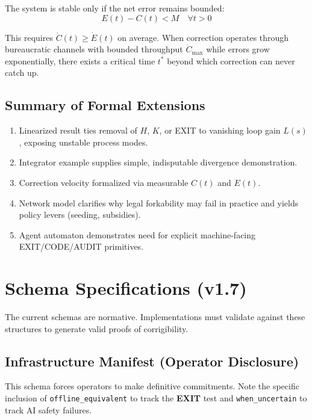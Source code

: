 \documentclass{article}
\begin{document}
The system is stable only if the net error remains bounded:
\begin{equation}
E(t) - C(t) < M \quad \forall t > 0
\end{equation}

This requires $\dot{C}(t) \geq \dot{E}(t)$ on average. When correction operates through bureaucratic channels with bounded throughput $\dot{C}_{\max}$ while errors grow exponentially, there exists a critical time $t^*$ beyond which correction can never catch up.

\subsection{Summary of Formal Extensions}

\begin{enumerate}
    \item Linearized result ties removal of $H$, $K$, or EXIT to vanishing loop gain $L(s)$, exposing unstable process modes.
    \item Integrator example supplies simple, indisputable divergence demonstration.
    \item Correction velocity formalized via measurable $C(t)$ and $E(t)$.
    \item Network model clarifies why legal forkability may fail in practice and yields policy levers (seeding, subsidies).
    \item Agent automaton demonstrates need for explicit machine-facing EXIT/CODE/AUDIT primitives.
\end{enumerate}

\section{Schema Specifications (v1.7)}
\label{appendix:schema}

The current schemas are normative. Implementations must validate against these structures to generate valid proofs of corrigibility.

\subsection{Infrastructure Manifest (Operator Disclosure)}

This schema forces operators to make definitive commitments. Note the specific inclusion of \texttt{offline\_equivalent} to track the \textbf{EXIT} test and \texttt{when\_uncertain} to track AI safety failures.
\end{document}
